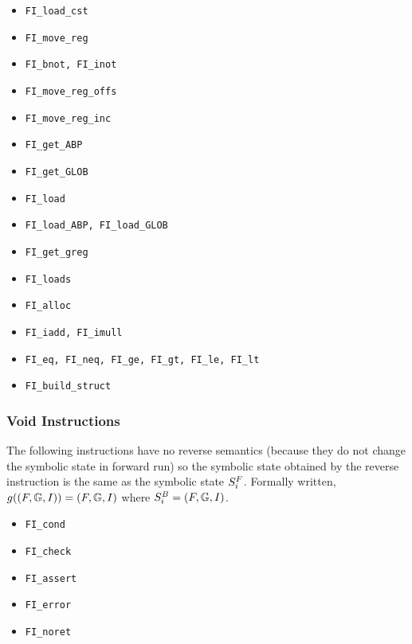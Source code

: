 \begin{itemize}

	\item {\tt FI\_load\_cst}

	\item {\tt FI\_move\_reg}

	\item {\tt FI\_bnot, FI\_inot}

	\item {\tt FI\_move\_reg\_offs}

	\item {\tt FI\_move\_reg\_inc}

	\item {\tt FI\_get\_ABP}

	\item {\tt FI\_get\_GLOB}

	\item {\tt FI\_load}
	
	\item {\tt FI\_load\_ABP, FI\_load\_GLOB}
	
	\item {\tt FI\_get\_greg}
	
	\item {\tt FI\_loads}
	
	\item {\tt FI\_alloc}

	\item {\tt FI\_iadd, FI\_imull}

	\item {\tt FI\_eq, FI\_neq, FI\_ge, FI\_gt, FI\_le, FI\_lt}
	
	\item {\tt FI\_build\_struct}

\end{itemize}

\subsubsection{Void Instructions}
The following instructions have no reverse semantics
(because they do not change the symbolic state in forward run)
so the symbolic state obtained by the reverse instruction
is the same as the symbolic state $S^{F}_{i}$.
Formally written, $g((F, \mathbb{G}, I)) = (F, \mathbb{G}, I)$ where $S^{B}_{i} = (F, \mathbb{G}, I)$.

\begin{itemize}
	
	\item {\tt FI\_cond}
	
	\item {\tt FI\_check}
	
	\item {\tt FI\_assert}
	
	\item {\tt FI\_error}
	
	\item {\tt FI\_noret}

\end{itemize}


